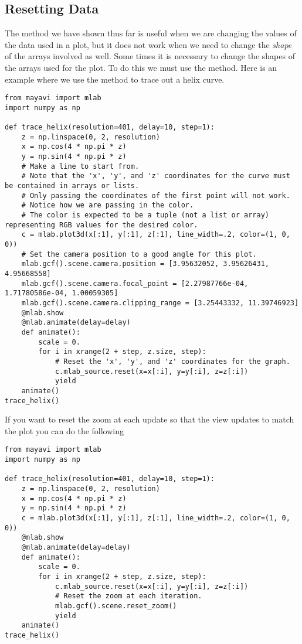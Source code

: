 \subsection*{Resetting Data}
The  method we have shown thus far is useful when we are changing the values of the data used in a plot, but it does not work when we need to change the \emph{shape} of the arrays involved as well.
Some times it is necessary to change the shapes of the arrays used for the plot.
To do this we must use the  method.
Here is an example where we use the  method to trace out a helix curve.
\begin{lstlisting}
from mayavi import mlab
import numpy as np

def trace_helix(resolution=401, delay=10, step=1):
    z = np.linspace(0, 2, resolution)
    x = np.cos(4 * np.pi * z)
    y = np.sin(4 * np.pi * z)
    # Make a line to start from.
    # Note that the 'x', 'y', and 'z' coordinates for the curve must be contained in arrays or lists.
    # Only passing the coordinates of the first point will not work.
    # Notice how we are passing in the color.
    # The color is expected to be a tuple (not a list or array) representing RGB values for the desired color.
    c = mlab.plot3d(x[:1], y[:1], z[:1], line_width=.2, color=(1, 0, 0))
    # Set the camera position to a good angle for this plot.
    mlab.gcf().scene.camera.position = [3.95632052, 3.95626431, 4.95668558]
    mlab.gcf().scene.camera.focal_point = [2.27987766e-04, 1.71780586e-04, 1.00059305]
    mlab.gcf().scene.camera.clipping_range = [3.25443332, 11.39746923]
    @mlab.show
    @mlab.animate(delay=delay)
    def animate():
        scale = 0.
        for i in xrange(2 + step, z.size, step):
            # Reset the 'x', 'y', and 'z' coordinates for the graph.
            c.mlab_source.reset(x=x[:i], y=y[:i], z=z[:i])
            yield
    animate()
trace_helix()
\end{lstlisting}

If you want to reset the zoom at each update so that the view updates to match the plot you can do the following
\begin{lstlisting}
from mayavi import mlab
import numpy as np

def trace_helix(resolution=401, delay=10, step=1):
    z = np.linspace(0, 2, resolution)
    x = np.cos(4 * np.pi * z)
    y = np.sin(4 * np.pi * z)
    c = mlab.plot3d(x[:1], y[:1], z[:1], line_width=.2, color=(1, 0, 0))
    @mlab.show
    @mlab.animate(delay=delay)
    def animate():
        scale = 0.
        for i in xrange(2 + step, z.size, step):
            c.mlab_source.reset(x=x[:i], y=y[:i], z=z[:i])
            # Reset the zoom at each iteration.
            mlab.gcf().scene.reset_zoom()
            yield
    animate()
trace_helix()
\end{lstlisting}

